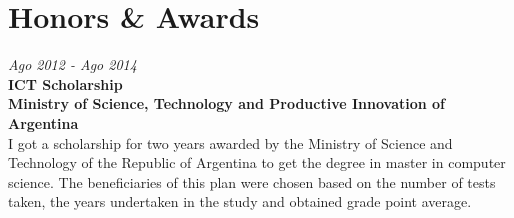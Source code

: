 \section{Honors \& Awards}

\begin{large}
    \textit{Ago 2012 - Ago 2014}\\
    \textbf{ICT Scholarship}\\
    \textbf{Ministry of Science, Technology and Productive Innovation of Argentina}\\
    I got a scholarship for two years awarded by the Ministry of Science and Technology of the Republic of Argentina to get the degree in master in computer science. The beneficiaries of this plan were chosen based on the number of tests taken, the years undertaken in the study and obtained grade point average.

\end{large}


